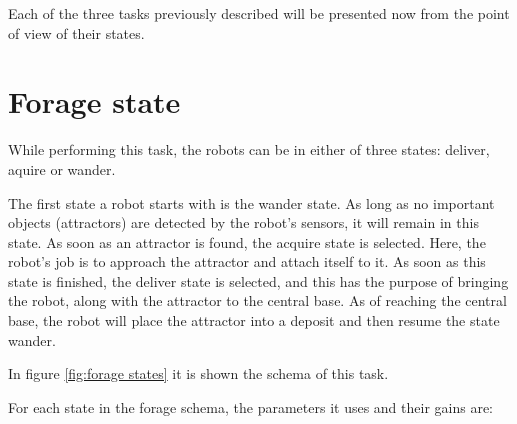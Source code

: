 \documentclass[12pt]{report}
\begin{document}
Each of the three tasks previously described will be presented now from the point of view of their states.




\section{Forage state}

While performing  this task, the robots can be in either of three states: deliver, aquire or wander.

The first state a robot starts with is the wander state. As long as no important objects (attractors) are detected by the robot's sensors, it will remain in this state. As soon as an attractor is found, the acquire state is selected. Here, the robot's job is to approach the attractor and attach itself to it.
As soon as this state is finished, the deliver state is selected, and this has the purpose of bringing the robot, along with the attractor to the central base. As of reaching the central base, the robot will place the attractor into a deposit and then resume the state wander.


In figure \autoref{fig:forage states} it is shown the schema of this task.

For each state in the forage schema, the parameters it uses and their gains are:
\end{document}
